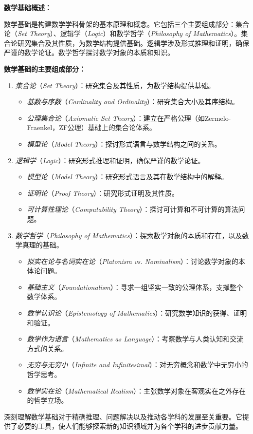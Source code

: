 
\begin{issues}
\issueAi
\end{issues}

\textbf{数学基础概述：}

数学基础是构建数学学科骨架的基本原理和概念。它包括三个主要组成部分：集合论（\emph{Set Theory}）、逻辑学（\emph{Logic}）和数学哲学（\emph{Philosophy of Mathematics}）。集合论研究集合及其性质，为数学结构提供基础。逻辑学涉及形式推理和证明，确保严谨的数学论证。数学哲学探讨数学对象的本质和知识。

\textbf{数学基础的主要组成部分：}

\begin{enumerate}
  \item \emph{集合论}（\emph{Set Theory}）：研究集合及其性质，为数学结构提供基础。
    \begin{itemize}
      \item \emph{基数与序数}（\emph{Cardinality and Ordinality}）：研究集合大小及其序结构。
      \item \emph{公理集合论}（\emph{Axiomatic Set Theory}）：建立在严格公理（如Zermelo-Fraenkel，ZF公理）基础上的集合论体系。
      \item \emph{模型论}（\emph{Model Theory}）：探讨形式语言与数学结构之间的关系。
    \end{itemize}
    
  \item \emph{逻辑学}（\emph{Logic}）：研究形式推理和证明，确保严谨的数学论证。
    \begin{itemize}
      \item \emph{模型论}（\emph{Model Theory}）：研究形式语言及其在数学结构中的解释。
      \item \emph{证明论}（\emph{Proof Theory}）：研究形式证明及其性质。
      \item \emph{可计算性理论}（\emph{Computability Theory}）：探讨可计算和不可计算的算法问题。
    \end{itemize}
    
  \item \emph{数学哲学}（\emph{Philosophy of Mathematics}）：探索数学对象的本质和存在，以及数学真理的基础。
    \begin{itemize}
      \item \emph{拟实在论与名词实在论}（\emph{Platonism vs. Nominalism}）：讨论数学对象的本体论问题。
      \item \emph{基础主义}（\emph{Foundationalism}）：寻求一组坚实一致的公理体系，支撑整个数学体系。
      \item \emph{数学认识论}（\emph{Epistemology of Mathematics}）：研究数学知识的获得、证明和验证。
      \item \emph{数学作为语言}（\emph{Mathematics as Language}）：考察数学与人类认知和交流方式的关系。
      \item \emph{无穷与无穷小}（\emph{Infinite and Infinitesimal}）：对无穷概念和数学中无穷小的哲学思考。
      \item \emph{数学实在论}（\emph{Mathematical Realism}）：主张数学对象在客观实在之外存在的哲学立场。
    \end{itemize}
\end{enumerate}

深刻理解数学基础对于精确推理、问题解决以及推动各学科的发展至关重要。它提供了必要的工具，使人们能够探索新的知识领域并为各个学科的进步贡献力量。
